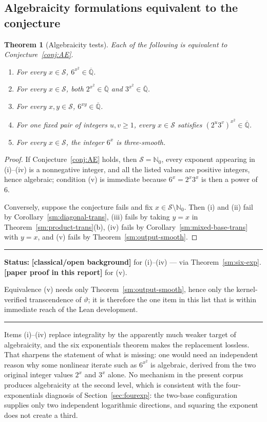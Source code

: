 \documentclass[11pt,oneside]{article}
\newtheorem{theorem}{Theorem}[section]
\theoremstyle{definition}
\theoremstyle{remark}
\newcommand{\Nzero}{\mathbb N_0}
\newcommand{\Abar}{\overline{\mathbb Q}}
\newcommand{\thetaq}{\vartheta}
\newcommand{\Sol}{\mathcal S}
\newcommand{\statusnew}{\textcolor{newgreen}{\textbf{[paper proof in this report]}}}
\newcommand{\statusknown}{\textcolor{classicalgray}{\textbf{[classical/\allowbreak open background]}}}
\newenvironment{statusbox}[1]
{\begin{center}\begin{minipage}{0.94\textwidth}\raggedright\hbadness=10000\hrule
\vspace{0.45em}\textbf{Status:} #1\par\vspace{0.35em}}
{\vspace{0.35em}\hrule\end{minipage}\end{center}}
\begin{document}
\subsection{Algebraicity formulations equivalent to the conjecture}

\begin{theorem}[Algebraicity tests]
\label{sm:algebraicity}
Each of the following is equivalent to Conjecture~\ref{conj:AE}.
\begin{enumerate}[label=\textup{(\roman*)}]
\item For every $x\in\Sol$, $6^{x^2}\in\Abar$.
\item For every $x\in\Sol$, both $2^{x^2}\in\Abar$ and $3^{x^2}\in\Abar$.
\item For every $x,y\in\Sol$, $6^{xy}\in\Abar$.
\item For one fixed pair of integers $u,v\ge1$, every $x\in\Sol$ satisfies
$(2^u3^v)^{x^2}\in\Abar$.
\item For every $x\in\Sol$, the integer $6^x$ is three-smooth.
\end{enumerate}
\end{theorem}

\begin{proof}
If Conjecture~\ref{conj:AE} holds, then $\Sol=\Nzero$, every exponent appearing in
(i)--(iv) is a nonnegative integer, and all the listed values are positive integers, hence
algebraic; condition (v) is immediate because $6^x=2^x3^x$ is then a power of $6$.

Conversely, suppose the conjecture fails and fix $x\in\Sol\setminus\Nzero$.  Then (i) and
(ii) fail by Corollary~\ref{sm:diagonal-trans}, (iii) fails by taking $y=x$ in
Theorem~\ref{sm:product-trans}(b), (iv) fails by Corollary~\ref{sm:mixed-base-trans} with
$y=x$, and (v) fails by Theorem~\ref{sm:output-smooth}.
\end{proof}

\begin{statusbox}{\statusknown{} for (i)--(iv) --- via Theorem~\ref{sm:six-exp}.
\statusnew{} for (v).}
Equivalence (v) needs only Theorem~\ref{sm:output-smooth}, hence only the kernel-verified
transcendence of $\thetaq$; it is therefore the one item in this list that is within
immediate reach of the Lean development.
\end{statusbox}

Items (i)--(iv) replace integrality by the apparently much weaker target of algebraicity, and
the six exponentials theorem makes the replacement lossless.  That sharpens the statement of
what is missing: one would need an independent reason why some nonlinear iterate such as
$6^{x^2}$ is algebraic, derived from the two original integer values $2^x$ and $3^x$ alone.
No mechanism in the present corpus produces algebraicity at the second level, which is
consistent with the four-exponentials diagnosis of Section~\ref{sec:fourexp}: the two-base
configuration supplies only two independent logarithmic directions, and squaring the exponent
does not create a third.
\end{document}
